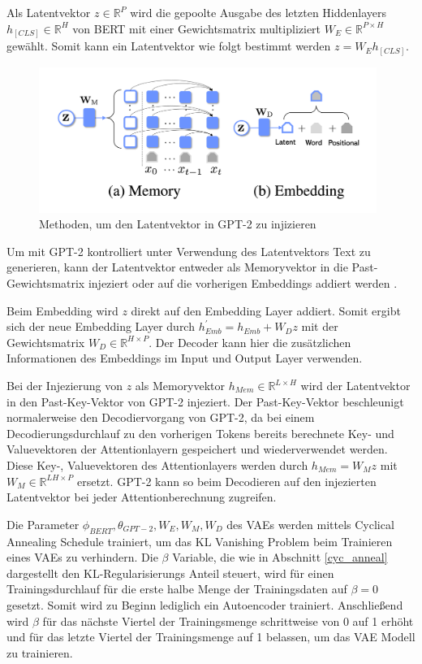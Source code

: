 Als Latentvektor $z \in \mathbb{R}^P$ wird die gepoolte Ausgabe des letzten Hiddenlayers $h_{[CLS]} \in \mathbb{R}^H$ von BERT mit einer Gewichtsmatrix multipliziert $W_{E} \in \mathbb{R}^{P\times H}$ gewählt. Somit kann ein Latentvektor wie folgt bestimmt werden $z = W_{E}h_{[CLS]}$.

\begin{figure}[h]
    \centering
    \includegraphics[width=11cm]{bilder/latent_optimus}
    \caption{Methoden, um den Latentvektor in GPT-2 zu injizieren \citep{DBLP:journals/corr/abs-2004-04092}}
    \label{latent_optimus}
\end{figure}

Um mit GPT-2 kontrolliert unter Verwendung des Latentvektors Text zu generieren, kann der Latentvektor entweder als Memoryvektor in die Past-Gewichtsmatrix injeziert oder auf die vorherigen Embeddings addiert werden \citep{DBLP:journals/corr/abs-2004-04092}.

Beim Embedding wird $z$ direkt auf den Embedding Layer addiert. Somit ergibt sich der neue Embedding Layer durch $h_{Emb}^{'} = h_{Emb} + W_D z$ mit der Gewichtsmatrix $W_D \in \mathbb{R}^{H \times P}$.
Der Decoder kann hier die zusätzlichen Informationen des Embeddings im Input und Output Layer verwenden.

Bei der Injezierung von $z$ als Memoryvektor $h_{Mem} \in \mathbb{R}^{L\times H}$ wird der Latentvektor in den Past-Key-Vektor von GPT-2 injeziert. 
Der Past-Key-Vektor beschleunigt normalerweise den Decodiervorgang von GPT-2, da bei einem Decodierungsdurchlauf zu den vorherigen Tokens bereits berechnete Key- und Valuevektoren der Attentionlayern gespeichert und wiederverwendet werden.
Diese Key-, Valuevektoren des Attentionlayers werden durch $h_{Mem} = W_M z$ mit $W_M \in \mathbb{R}^{LH \times P}$ ersetzt. GPT-2 kann so beim Decodieren auf den injezierten Latentvektor bei jeder Attentionberechnung zugreifen.

Die Parameter ${\phi_{BERT}, \theta_{GPT-2}, W_E,W_M,W_D}$ des VAEs werden mittels Cyclical Annealing Schedule \citep{cyc_anneal} trainiert, um das KL Vanishing Problem beim Trainieren eines VAEs zu verhindern.
Die $\beta$ Variable, die wie in Abschnitt \ref{cyc_anneal} dargestellt den KL-Regularisierungs Anteil steuert, wird für einen Trainingsdurchlauf für die erste halbe Menge der Trainingsdaten auf $\beta = 0$ gesetzt. Somit wird zu Beginn lediglich ein Autoencoder trainiert. 
Anschließend wird $\beta$ für das nächste Viertel der Trainingsmenge schrittweise von 0 auf 1 erhöht und für das letzte Viertel der Trainingsmenge auf 1 belassen, um das VAE Modell zu trainieren.

